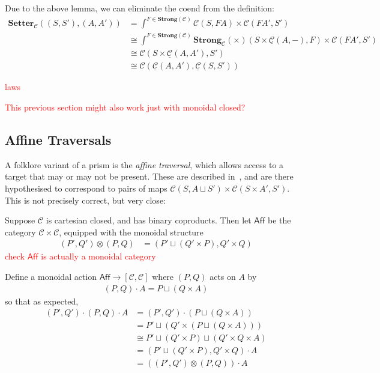 \documentclass[11pt,a4paper]{article}
\theoremstyle{plain}
\theoremstyle{definition}
\newcommand{\C}{\mathscr{C}}
\newcommand{\homC}{\underline{\C}}
\newcommand{\Setter}{\mathbf{Setter}}
\newcommand{\Strong}{\mathbf{Strong}}
\newcommand{\todo}[1]{\textcolor{red}{\small #1}}
\begin{document}
Due to the above lemma, we can eliminate the coend from the definition:
\begin{align*}
  \Setter_\C((S, S'), (A, A')) &= \int^{F \in \Strong(\C)} \C(S, FA) \times \C(FA', S') \\
                               &\cong \int^{F \in \Strong(\C)} \Strong_\C(\times)(S \times \homC(A, -), F)  \times \C(FA', S') \\
                               &\cong \C(S \times \homC(A, A'), S') \\
                               &\cong \C(\homC(A, A'), \homC(S,S'))
\end{align*}

\todo{laws}

\todo{This previous section might also work just with monoidal closed?}

\subsection{Affine Traversals}

A folklore variant of a prism is the \emph{affine traversal}, which allows access to a target that may or may not be present. These are described in~\cite{AffineTraversalPost}, and are there hypothesised to correspond to pairs of maps $\C(S, A \sqcup S') \times \C(S\times A', S')$. This is not precisely correct, but very close:

Suppose $\C$ is cartesian closed, and has binary coproducts. Then let $\mathsf{Aff}$ be the category $\C \times \C$, equipped with the monoidal structure
\begin{align*}
  (P', Q') \otimes (P, Q) &= (P' \sqcup (Q' \times P) , Q' \times Q)
\end{align*}
\todo{check $\mathsf{Aff}$ is actually a monoidal category}

Define a monoidal action $\mathsf{Aff} \to [\C, \C]$ where $(P, Q)$ acts on $A$ by
\begin{align*}
  (P, Q) \cdot A = P \sqcup (Q \times A)
\end{align*}
so that as expected,
\begin{align*}
  (P', Q') \cdot (P, Q) \cdot A
  &= (P', Q') \cdot  (P \sqcup (Q \times A)) \\
  &= P' \sqcup (Q' \times (P \sqcup (Q \times A))) \\
  &\cong P' \sqcup (Q' \times P) \sqcup (Q' \times Q \times A) \\
  &= (P' \sqcup (Q' \times P) , Q' \times Q) \cdot A \\
  &= ((P', Q') \otimes (P, Q)) \cdot A
\end{align*}
\end{document}
